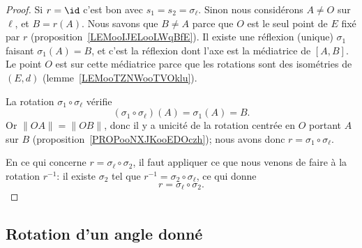 \begin{proof}
	Si \( r=\id\) c'est bon avec \( s_1=s_2=\sigma_{\ell}\). Sinon nous considérons \( A\neq O\) sur \( \ell\), et \( B=r(A)\). Nous savons que \( B\neq A\) parce que \( O\) est le seul point de \( E\) fixé par \( r\) (proposition~\ref{LEMooIJELooLWqBfE}). Il existe une réflexion (unique) \( \sigma_1\) faisant \( \sigma_1(A)=B\), et c'est la réflexion dont l'axe est la médiatrice de \( [A,B]\). Le point \( O\) est sur cette médiatrice parce que les rotations sont des isométries de \( (E,d)\) (lemme~\ref{LEMooTZNWooTVOklu}).

	La rotation \( \sigma_1\circ \sigma_{\ell}\) vérifie
	\begin{equation}
		(\sigma_1\circ\sigma_{\ell})(A)=\sigma_1(A)=B.
	\end{equation}
	Or \( \| OA \|=\| OB \|\), donc il y a unicité de la rotation centrée en \( O\) portant \( A\) sur \( B\) (proposition~\ref{PROPooNXJKooEDOczh}); nous avons donc \( r=\sigma_1\circ\sigma_{\ell}\).

	En ce qui concerne \( r=\sigma_{\ell}\circ\sigma_2\), il faut appliquer ce que nous venons de faire à la rotation \( r^{-1}\): il existe \( \sigma_2\) tel que \( r^{-1}=\sigma_2\circ\sigma_{\ell}\), ce qui donne
	\begin{equation}
		r=\sigma_{\ell}\circ\sigma_2.
	\end{equation}
\end{proof}

\subsection{Rotation d'un angle donné}


